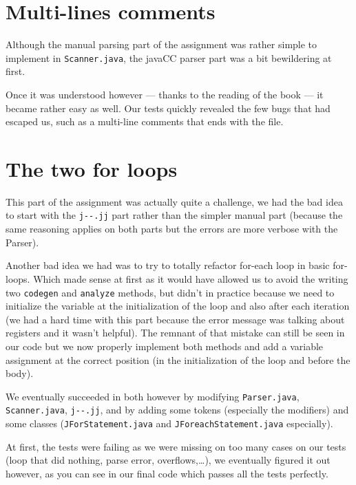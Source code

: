 \documentclass[a4paper, 11pt]{article}
\begin{document}
    \section{Multi-lines comments}

		Although the manual parsing part of the assignment was rather simple to
		implement in \verb#Scanner.java#, the javaCC parser part was a bit bewildering at first.
		\newline

		Once it was understood however --- thanks to the reading of the book --- it became
		rather easy as well. Our tests quickly revealed the few bugs that had escaped us,
		such as a multi-line comments that ends with the file.

	\section{The two for loops}

		This part of the assignment was actually quite a challenge, we had the
        bad idea to start with the \verb#j--.jj# part rather than the simpler
        manual part (because the same reasoning applies on both parts but
        the errors are more verbose with the Parser).\newline

		Another bad idea we had was to try to totally refactor for-each loop in
		basic for-loops. Which made sense at first as it would have allowed us
        to avoid the writing two \verb#codegen# and \verb#analyze# methods, but didn't in practice because we need to initialize the variable at the
        initialization of the loop and also after each iteration (we had a hard
        time with this part because the error message was talking about
        registers and it wasn't helpful). The remnant
        of that mistake can still be seen in our code but we now properly
        implement both methods and add a variable assignment at the correct
        position (in the initialization of the loop and before the body).\newline

		We eventually succeeded in both however by modifying \verb#Parser.java#,
        \verb#Scanner.java#, \verb#j--.jj#, and by adding some tokens
        (especially the modifiers) and some classes (\verb#JForStatement.java#
        and \verb#JForeachStatement.java# especially).\newline

		At first, the tests were failing as we were missing on too many cases on
        our tests (loop that did nothing, parse error, overflows,\ldots), we
        eventually figured it out however, as you can see in our final code
        which passes all the tests perfectly.
\end{document}

